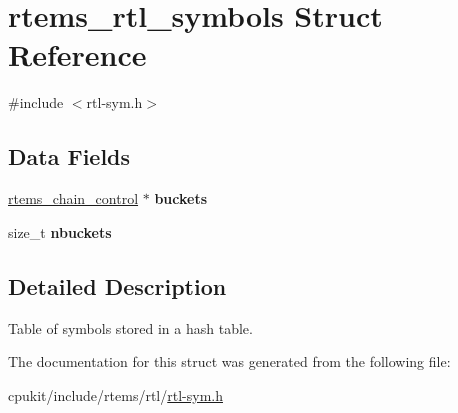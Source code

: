 \hypertarget{structrtems__rtl__symbols}{}\section{rtems\+\_\+rtl\+\_\+symbols Struct Reference}
\label{structrtems__rtl__symbols}


{\ttfamily \#include $<$rtl-\/sym.\+h$>$}

\subsection*{Data Fields}
\begin{DoxyCompactItemize}
\item 
\mbox{\label{structrtems__rtl__symbols_a475bbd340f3a2fb1746d33418dc0f58a}} 
\mbox{\hyperlink{unionChain__Control}{rtems\+\_\+chain\+\_\+control}} $\ast$ {\bfseries buckets}
\item 
\mbox{\label{structrtems__rtl__symbols_ae35a59bb560667593c4c72c7b912a58a}} 
size\+\_\+t {\bfseries nbuckets}
\end{DoxyCompactItemize}


\subsection{Detailed Description}
Table of symbols stored in a hash table. 

The documentation for this struct was generated from the following file\+:\begin{DoxyCompactItemize}
\item 
cpukit/include/rtems/rtl/\mbox{\hyperlink{rtl-sym_8h}{rtl-\/sym.\+h}}\end{DoxyCompactItemize}
